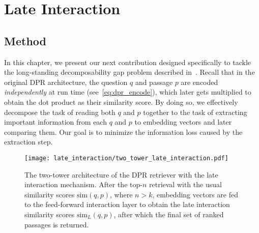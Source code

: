 
\chapter{Late Interaction} %
\label{ch:late_interaction}


\section{Method}
\label{ch:late_interaction_method}
%
In this chapter, we present our next contribution designed specifically to tackle the long-standing decomposability gap problem described in~.
%
Recall that in the original DPR architecture, the question $q$ and passage $p$ are encoded \emph{independently} at run time (see~\eqref{eq:dpr_encode}), which later gets multiplied to obtain the dot product as their similarity score.
%
By doing so, we effectively decompose the task of reading both $q$ and $p$ together to the task of extracting important information from each $q$ and $p$ to embedding vectors and later comparing them.
%
Our goal is to minimize the information loss caused by the extraction step.


\begin{figure}[!htbp]
	\centering
	\texttt{[image: late\_interaction/two\_tower\_late\_interaction.pdf]}
	\caption[Two-tower architecture of DPR retriever with the late interaction mechanism.]{
		The two-tower architecture of the DPR retriever with the late interaction mechanism.
		After the top-$n$ retrieval with the usual similarity scores $\text{sim}(q, p)$, where $n > k$, embedding vectors are fed to the feed-forward interaction layer to obtain the late interaction similarity scores $\text{sim}_L(q, p)$, after which the final set of ranked passages is returned.
	}
	\label{fig:two_tower}
\end{figure}


